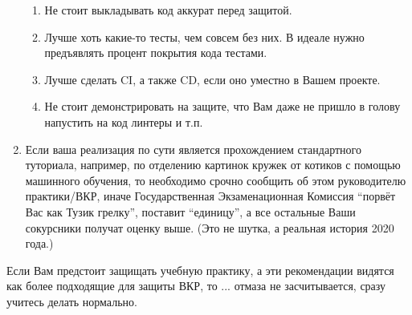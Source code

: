 \begin{enumerate}
\begin{enumerate}
              \item Не стоит выкладывать код аккурат перед защитой.
              \item Лучше хоть какие-то тесты, чем совсем без них. В идеале нужно предъявлять процент покрытия кода тестами.
              \item Лучше сделать \textsc{CI}, а также \textsc{CD}, если оно уместно в Вашем проекте.
              \item Не стоит демонстрировать на защите, что Вам даже не пришло в голову напустить на код линтеры и т.п.
          \end{enumerate}
    \item Если ваша реализация по сути является прохождением стандартного туториала,
          например, по отделению картинок кружек от котиков с помощью машинного обучения, то необходимо срочно сообщить об этом руководителю практики/ВКР,
          иначе Государственная Экзаменацион\-ная Комиссия \enquote{порвёт Вас как Тузик грелку}, поставит \enquote{единицу},
          а все остальные Ваши сокурсники получат оценку выше. (Это не шутка, а реальная история 2020 года.)
\end{enumerate}

\noindent Если Вам предстоит защищать учебную практику, а эти рекомендации видятся как более подходящие для защиты ВКР, то ... отмаза не засчиты\-вается, сразу учитесь делать нормально.
